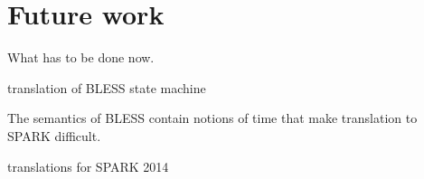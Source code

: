 
\cleardoublepage

\chapter{Future work}
\label{future_work}

What has to be done now.

translation of BLESS state machine

The semantics of BLESS contain notions of time that make translation to SPARK difficult.

translations for SPARK 2014